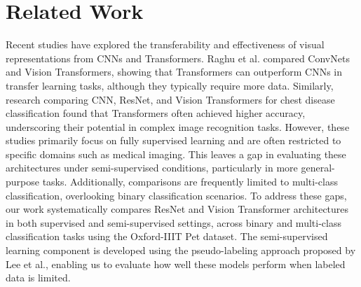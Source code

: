 \documentclass{article}
\begin{document}


\section{Related Work}
Recent studies have explored the transferability and effectiveness of visual representations from CNNs and Transformers. Raghu et al.\cite{convnetvstransformers} compared ConvNets and Vision Transformers, showing that Transformers can outperform CNNs in transfer learning tasks, although they typically require more data. Similarly, research comparing CNN, ResNet, and Vision Transformers for chest disease classification\cite{chest} found that Transformers often achieved higher accuracy, underscoring their potential in complex image recognition tasks. However, these studies primarily focus on fully supervised learning and are often restricted to specific domains such as medical imaging. This leaves a gap in evaluating these architectures under semi-supervised conditions, particularly in more general-purpose tasks. Additionally, comparisons are frequently limited to multi-class classification, overlooking binary classification scenarios. To address these gaps, our work systematically compares ResNet and Vision Transformer architectures in both supervised and semi-supervised settings, across binary and multi-class classification tasks using the Oxford-IIIT Pet dataset. The semi-supervised learning component is developed using the pseudo-labeling approach proposed by Lee et al.\cite{lee2013pseudo}, enabling us to evaluate how well these models perform when labeled data is limited.
\end{document}
